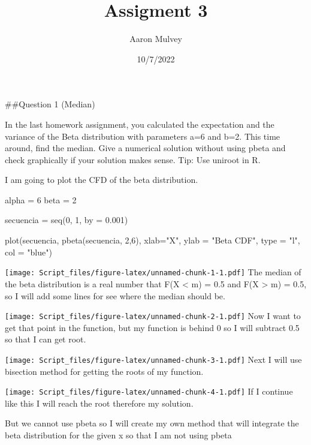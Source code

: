 \documentclass[
]{article}
\title{Assigment 3}
\author{Aaron Mulvey}
\date{10/7/2022}
\newenvironment{Shaded}{\begin{snugshade}}{\end{snugshade}}
\newcommand{\AttributeTok}[1]{\textcolor[rgb]{0.77,0.63,0.00}{#1}}
\newcommand{\DecValTok}[1]{\textcolor[rgb]{0.00,0.00,0.81}{#1}}
\newcommand{\FloatTok}[1]{\textcolor[rgb]{0.00,0.00,0.81}{#1}}
\newcommand{\FunctionTok}[1]{\textcolor[rgb]{0.00,0.00,0.00}{#1}}
\newcommand{\NormalTok}[1]{#1}
\newcommand{\OtherTok}[1]{\textcolor[rgb]{0.56,0.35,0.01}{#1}}
\newcommand{\StringTok}[1]{\textcolor[rgb]{0.31,0.60,0.02}{#1}}
\begin{document}
\maketitle

\#\#Question 1 (Median)

In the last homework assignment, you calculated the expectation and the
variance of the Beta distribution with parameters a=6 and b=2. This time
around, find the median. Give a numerical solution without using pbeta
and check graphically if your solution makes sense. Tip: Use uniroot in
R.

I am going to plot the CFD of the beta distribution.

\begin{Shaded}
\begin{Highlighting}[]
\NormalTok{alpha }\OtherTok{=} \DecValTok{6}
\NormalTok{beta }\OtherTok{=} \DecValTok{2}

\NormalTok{secuencia }\OtherTok{=} \FunctionTok{seq}\NormalTok{(}\DecValTok{0}\NormalTok{, }\DecValTok{1}\NormalTok{, }\AttributeTok{by =} \FloatTok{0.001}\NormalTok{)}

\FunctionTok{plot}\NormalTok{(secuencia, }\FunctionTok{pbeta}\NormalTok{(secuencia, }\DecValTok{2}\NormalTok{,}\DecValTok{6}\NormalTok{), }\AttributeTok{xlab=}\StringTok{"X"}\NormalTok{,}
     \AttributeTok{ylab =} \StringTok{"Beta CDF"}\NormalTok{, }\AttributeTok{type =} \StringTok{"l"}\NormalTok{, }\AttributeTok{col =} \StringTok{"blue"}\NormalTok{)}
\end{Highlighting}
\end{Shaded}

\texttt{[image: Script\_files/figure-latex/unnamed-chunk-1-1.pdf]} The
median of the beta distribution is a real number that F(X \textless{} m)
= 0.5 and F(X \textgreater{} m) = 0.5, so I will add some lines for see
where the median should be.

\texttt{[image: Script\_files/figure-latex/unnamed-chunk-2-1.pdf]} Now I
want to get that point in the function, but my function is behind 0 so I
will subtract 0.5 so that I can get root.

\texttt{[image: Script\_files/figure-latex/unnamed-chunk-3-1.pdf]} Next I
will use bisection method for getting the roots of my function.

\texttt{[image: Script\_files/figure-latex/unnamed-chunk-4-1.pdf]} If I
continue like this I will reach the root therefore my solution.

But we cannot use pbeta so I will create my own method that will
integrate the beta distribution for the given x so that I am not using
pbeta
\end{document}
